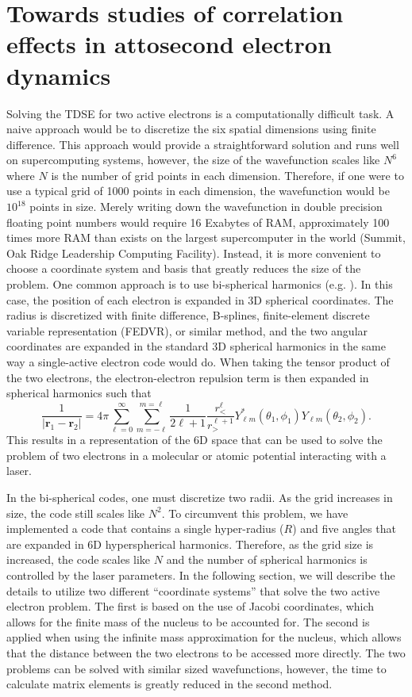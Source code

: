 \chapter{Towards studies of correlation effects in attosecond electron dynamics} %
\label{cha:electron_correlation}


Solving the TDSE for two active electrons is a computationally difficult task. A naive approach would be to discretize the six spatial dimensions using finite difference. This approach would provide a straightforward solution and runs well on supercomputing systems, however, the size of the wavefunction scales like $N^6$ where $N$ is the number of grid points in each dimension. Therefore, if one were to use a typical grid of 1000 points in each dimension, the wavefunction would be $10^{18}$ points in size. Merely writing down the wavefunction in double precision floating point numbers would require 16 Exabytes of RAM, approximately 100 times more RAM than exists on the largest supercomputer in the world (Summit, Oak Ridge Leadership Computing Facility). Instead, it is more convenient to choose a coordinate system and basis that greatly reduces the size of the problem. One common approach is to use bi-spherical harmonics (e.g. \cite{vanroose2006}). In this case, the position of each electron is expanded in 3D spherical coordinates. The radius is discretized with finite difference, B-splines, finite-element discrete variable representation (FEDVR), or similar method, and the two angular coordinates are expanded in the standard 3D spherical harmonics in the same way a single-active electron code would do. When taking the tensor product of the two electrons, the electron-electron repulsion term is then expanded in spherical harmonics such that
\begin{equation}
    \frac{1}{|\mathbf{r}_1-\mathbf{r}_2|}= 4\pi \sum_{\ell=0}^\infty \sum_{m=-\ell}^{m=\ell}\frac{1}{2\ell+1}\frac{r_<^\ell}{r_>^{\ell+1}}Y_{\ell m}^*(\theta_1, \phi_1)Y_{\ell m}(\theta_2, \phi_2).
\end{equation}
This results in a representation of the 6D space that can be used to solve the problem of two electrons in a molecular or atomic potential interacting with a laser.

In the bi-spherical codes, one must discretize two radii. As the grid increases in size, the code still scales like $N^2$. To circumvent this problem, we have implemented a code that contains a single hyper-radius ($R$) and five angles that are expanded in 6D hyperspherical harmonics. Therefore, as the grid size is increased, the code scales like $N$ and the number of spherical harmonics is controlled by the laser parameters. In the following section, we will describe the details to utilize two different ``coordinate systems'' that solve the two active electron problem. The first is based on the use of Jacobi coordinates, which allows for the finite mass of the nucleus to be accounted for. The second is applied when using the infinite mass approximation for the nucleus, which allows that the distance between the two electrons to be accessed more directly. The two problems can be solved with similar sized wavefunctions, however, the time to calculate matrix elements is greatly reduced in the second method. 


